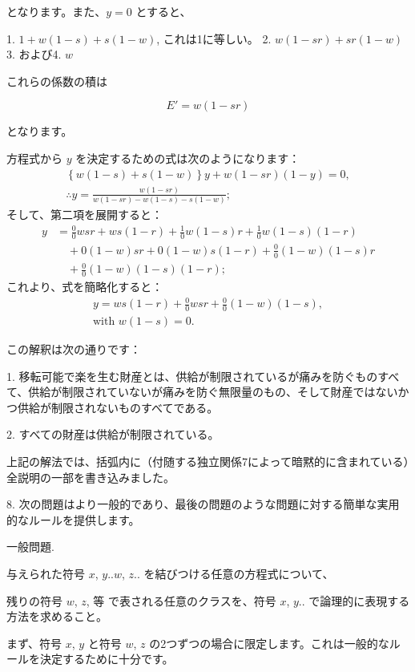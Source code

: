 \documentclass[a4paper,11pt,openany]{ltjsbook}
\begin{document}
となります。また、$y = 0$ とすると、

1. $1 + w(1-s) + s(1-w)$, これは1に等しい。
2. $w(1-sr) + sr(1-w)$
3. および4. $w$

これらの係数の積は

\[
E' = w(1-sr)
\]

となります。

方程式から $y$ を決定するための式は次のようになります：
\begin{eqnarray*}
\left\{w(1-s)+s(1-w)\right\}y + w(1-sr)(1-y)=0,\\
\therefore y=\frac{w(1-sr)}{w(1-sr)-w(1-s)-s(1-w)};
\end{eqnarray*}
そして、第二項を展開すると：
\begin{eqnarray*}
y&=\frac{0}{0}wsr+ws(1-r)+\frac{1}{0}w(1-s)r+\frac{1}{0}w(1-s)(1-r)\\
&\quad+0(1-w)sr+0(1-w)s(1-r)+\frac{0}{0}(1-w)(1-s)r\\
&\quad+\frac{0}{0}(1-w)(1-s)(1-r);
\end{eqnarray*}
これより、式を簡略化すると：
\begin{eqnarray}
y=ws(1-r) + \frac{0}{0}wsr + \frac{0}{0}(1-w)(1-s),\\
\textrm{with }w (1-s) = 0.
\end{eqnarray}

この解釈は次の通りです：

1. 移転可能で楽を生む財産とは、供給が制限されているが痛みを防ぐものすべて、供給が制限されていないが痛みを防ぐ無限量のもの、そして財産ではないかつ供給が制限されないものすべてである。

2. すべての財産は供給が制限されている。

上記の解法では、括弧内に（付随する独立関係7によって暗黙的に含まれている）全説明の一部を書き込みました。

8. 次の問題はより一般的であり、最後の問題のような問題に対する簡単な実用的なルールを提供します。

\begin{center}
\textsc{一般問題}.
\end{center}

与えられた符号 $x$, $y..w$, $z..$ を結びつける任意の方程式について、

残りの符号 $w$, $z$, 等 で表される任意のクラスを、符号 $x$, $y..$ で論理的に表現する方法を求めること。

まず、符号 $x$, $y$ と符号 $w$, $z$ の2つずつの場合に限定します。これは一般的なルールを決定するために十分です。
\end{document}
